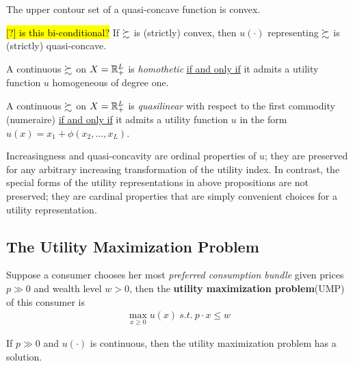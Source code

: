 \documentclass{article}
\begin{document}
 			\begin{lemma}
 				The upper contour set of a quasi-concave function is convex.
 			\end{lemma}
 			
 			\begin{proposition}
 				\hl{[?] is this bi-conditional?}
 				If $\succsim$ is (strictly) convex, then $u(\cdot)$ representing $\succsim$ is (strictly) quasi-concave.
 			\end{proposition}
 			
 			\begin{proposition}
 				A continuous $\succsim$ on $X = \mathbb{R}^L_+$ is \emph{homothetic} \ul{if and only if} it admits a utility function $u$ homogeneous of degree one.
 			\end{proposition}
 			
 			\begin{proposition}
 				A continuous $\succsim$ on $X = \mathbb{R}^L_+$ is \emph{quasilinear} with respect to the first commodity (numeraire) \ul{if and only if} it admits a utility function $u$ in the form $u(x) = x_1 + \phi(x_2, \dots, x_L)$.
 			\end{proposition}
 			
 			\begin{remark}
 				Increasingness and quasi-concavity are ordinal properties of $u$; they are preserved for any arbitrary increasing transformation of the utility index. In contrast, the special forms of the utility representations in above propositions are not preserved; they are cardinal properties that are simply convenient choices for a utility representation.
 			\end{remark}
 		
 		\subsection{The Utility Maximization Problem}
 			\begin{definition}
 				Suppose a consumer chooses her most \emph{preferred consumption bundle} given prices $p \gg 0$ and wealth level $w > 0$, then the \textbf{utility maximization problem}(UMP) of this consumer is
 				\begin{align}
 					\max_{x \geq 0} u(x)\ s.t.\ p \cdot x \leq w
 				\end{align}
 			\end{definition}
 			
 			\begin{proposition}[3.D.1]
 				If $p \gg 0$ and $u(\cdot)$ is continuous, then the utility maximization problem has a solution.
 			\end{proposition}
 			
\end{document}
